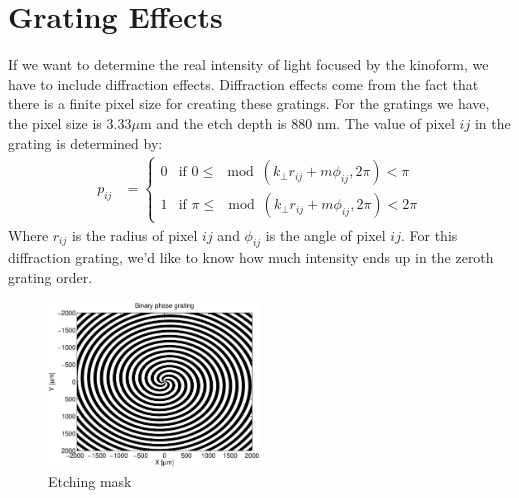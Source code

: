 \documentclass[12pt]{revtex4-1}
\begin{document}
\section{Grating Effects}
If we want to determine the real intensity of light focused by the kinoform, we have to include diffraction effects. Diffraction effects come from the fact that there is a finite pixel size for creating these gratings. For the gratings we have, the pixel size is $3.33 \mu$m and the etch depth is 880 nm. The value of pixel $ij$ in the grating is determined by:
\begin{align*}
 p_{ij} &=
  \begin{cases}
   0        & \text{if } 0 \leq \mod(k_\perp r_{ij} + m \phi_{ij},2\pi) < \pi\\
   1        & \text{if } \pi \leq \mod(k_\perp r_{ij} + m \phi_{ij},2\pi) < 2\pi
  \end{cases}
\end{align*}
Where $r_{ij}$ is the radius of pixel $ij$ and $\phi_{ij}$ is the angle of pixel $ij$. For this diffraction grating, we'd like to know how much intensity ends up in the zeroth grating order.

\begin{figure}[tbh]
    \includegraphics[width=0.5\textwidth]{mask.eps}
    \caption{Etching mask}
\end{figure}
\end{document}
